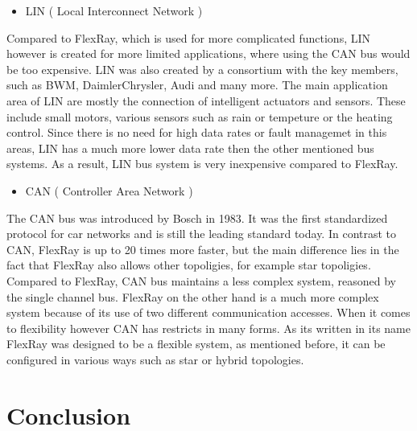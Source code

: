 \documentclass[conference]{IEEEtran}
\begin{document}
\begin{itemize}
  \item LIN ( Local Interconnect Network )
\end{itemize}
Compared to FlexRay, which is used for more complicated functions, LIN however is created for more limited applications, where using the CAN bus would be too expensive. LIN was also created by a consortium with the key members, such as BWM, DaimlerChrysler, Audi and many more. The main application area of LIN are mostly the connection of intelligent actuators and sensors. These include small motors, various sensors such as rain or tempeture or the heating control. Since there is no need for high data rates or fault managemet in this areas, LIN has a much more lower data rate then the other mentioned bus systems. As a result, LIN bus system is very inexpensive compared to FlexRay.\\

\begin{itemize}
  \item CAN ( Controller Area Network )
\end{itemize}

The CAN bus was introduced by Bosch in 1983. It was the first standardized protocol for car networks and is still the leading standard today. In contrast to CAN, FlexRay is up to 20 times more faster, but the main difference lies in the fact that FlexRay also allows other topoligies, for example star topoligies. Compared to FlexRay, CAN bus maintains a less complex system, reasoned by the single channel bus. FlexRay on the other hand is a much more complex system because of its use of two different communication accesses. When it comes to flexibility however CAN has restricts in many forms. As its written in its name FlexRay was designed to be a flexible system, as mentioned before, it can be configured in various ways such as star or hybrid topologies.

\section*{Conclusion}
\end{document}
